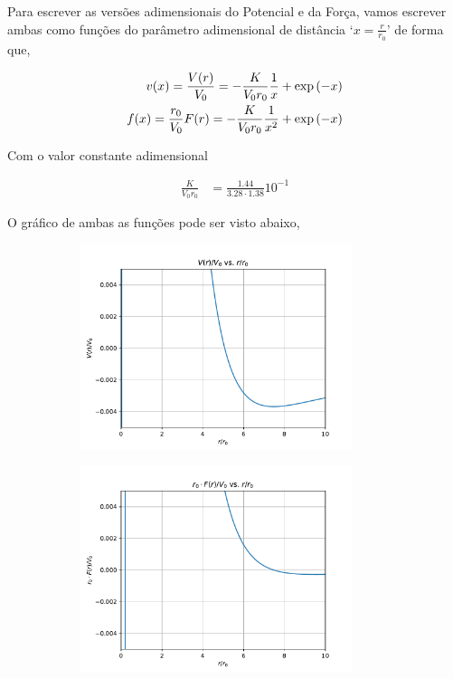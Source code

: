 \documentclass[twoside]{amsart}
\numberwithin{equation}{section}
\begin{document}
Para escrever as versões adimensionais do Potencial e da Força, vamos escrever ambas como funções do parâmetro adimensional de 
distância `$x=\frac{r}{r_0}$' de forma que,

\begin{align}
    v\qty(x) = \frac{V\qty(r)}{V_0} = -\frac{K}{V_0r_0}\frac1x+\exp\qty(-x)\\
    f\qty(x) = \frac{r_0}{V_0}F\qty(r) = -\frac{K}{V_0r_0}\frac{1}{x^2}+\exp\qty(-x)
\end{align}

Com o valor constante adimensional

\begin{align}
    \frac{K}{V_0r_0} &=\frac{1.44}{3.28\cdot1.38}10^{-1}
\end{align}

O gráfico de ambas as funções pode ser visto abaixo,

\begin{figure}[h]
    \begin{subfigure}{0.4\textwidth}
        \includegraphics[width=1\linewidth, height=6cm]{potencial.pdf}
    \end{subfigure}
    \begin{subfigure}{0.4\textwidth}
        \includegraphics[width=1\linewidth, height=6cm]{forca.pdf}
    \end{subfigure}
\end{figure}
\end{document}

